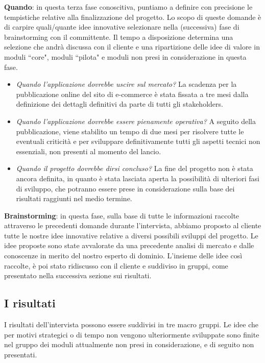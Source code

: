 \documentclass[12pt]{article}
\begin{document}
\textbf{Quando}: in questa terza fase conoscitiva, puntiamo a definire con precisione le tempistiche relative alla finalizzazione del progetto. Lo scopo di queste domande è di carpire quali/quante idee innovative selezionare nella (successiva) fase di brainstorming con il committente. Il tempo a disposizione determina una selezione che andrà discussa con il cliente e una ripartizione delle idee di valore in moduli ``core", moduli ``pilota" e moduli non presi in considerazione in questa fase.
\begin{itemize}
    \item {\em Quando l'applicazione dovrebbe uscire sul mercato?}
    La scadenza per la pubblicazione online del sito di e-commerce è stata fissata a tre mesi dalla definizione dei dettagli definitivi da parte di tutti gli stakeholders. 
    \item {\em Quando l'applicazione dovrebbe essere pienamente operativa?}
    A seguito della pubblicazione, viene stabilito un tempo di due mesi per risolvere tutte le eventuali criticità e per sviluppare definitivamente tutti gli aspetti tecnici non essenziali, non presenti al momento del lancio.
    \item {\em Quando il progetto dovrebbe dirsi concluso?}
    La fine del progetto non è stata ancora definita, in quanto è stata lasciata aperta la possibilità di ulteriori fasi di sviluppo, che potranno essere prese in considerazione sulla base dei risultati raggiunti nel medio termine.
    
\end{itemize}



\textbf{Brainstorming}: in questa fase, sulla base di tutte le informazioni raccolte attraverso le precedenti domande durante l'intervista, abbiamo proposto al cliente tutte le nostre idee innovative relative a diversi possibili sviluppi del progetto. Le idee proposte sono state avvalorate da una precedente analisi di mercato e dalle conoscenze in merito del nostro esperto di dominio. L'insieme delle idee così raccolte, è poi stato ridiscusso con il cliente e suddiviso in gruppi, come presentato nella successiva sezione sui risultati.
\\

\subsection{I risultati}

I risultati dell'intervista possono essere suddivisi in tre macro gruppi.
Le idee che per motivi strategici o di tempo non vengono ulteriormente sviluppate sono finite nel gruppo dei moduli attualmente non presi in considerazione, e di seguito non presentati.
\end{document}
